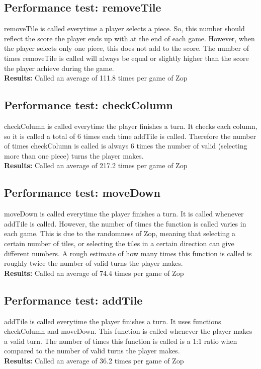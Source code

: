 \documentclass[12pt]{article}
\begin{document}
\subsection{Performance test: removeTile}
removeTile is called everytime a player selects a piece.  So, this number should reflect the score the player ends up with at the end of each game.  However, when the player selects only one piece, this does not add to the score.  The number of times removeTile is called will always be equal or slightly higher than the score the player achieve during the game. \\
\textbf{Results: } Called an average of 111.8 times per game of Zop

	
\subsection{Performance test: checkColumn}
checkColumn is called everytime the player finishes a turn.  It checks each column, so it is called a total of 6 times each time addTile is called.  Therefore the number of times checkColumn is called is always 6 times the number of valid (selecting more than one piece) turns the player makes.\\
\textbf{Results: } Called an average of 217.2 times per game of Zop

\subsection{Performance test: moveDown}
moveDown is called everytime the player finishes a turn. It is called whenever addTile is called.  However, the number of times the function is called varies in each game.  This is due to the randomness of Zop, meaning that selecting a certain number of tiles, or selecting the tiles in a certain direction can give different numbers.  A rough estimate of how many times this function is called is roughly twice the number of valid turns the player makes.\\
\textbf{Results: } Called an average of 74.4 times per game of Zop

\subsection{Performance test: addTile}
addTile is called everytime the player finishes a turn.  It uses functions checkColumn and moveDown.  This function is called whenever the player makes a valid turn.  The number of times this function is called is a 1:1 ratio when compared to the number of valid turns the player makes.\\
\textbf{Results: } Called an average of 36.2 times per game of Zop
\end{document}
